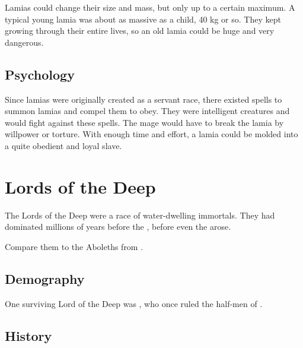Lamias could change their size and mass, but only up to a certain maximum. 
A typical young lamia was about as massive as a \human child, 40 kg or so. 
They kept growing through their entire lives, so an old lamia could be huge and very dangerous.









\subsection{Psychology}
Since lamias were originally created as a servant race, there existed spells to summon lamias and compel them to obey. 
They were intelligent creatures and would fight against these spells. 
The mage would have to break the lamia by willpower or torture. 
With enough time and effort, a lamia could be molded into a quite obedient and loyal slave. 















\section{Lords of the Deep}
The Lords of the Deep were a race of water-dwelling immortals.
They had dominated \Miith millions of years before the \banewars, before even the \shugul arose. 

Compare them to the Aboleths from \cite{RPG:DungeonsandDragons}.









\subsection{Demography}
One surviving Lord of the Deep was , who once ruled the half-men of .









\subsection{History}





